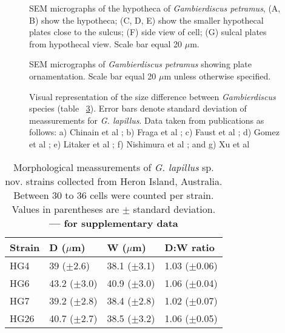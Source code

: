 \documentclass[12pt]{article}
\begin{document}
\FloatBarrier 
\begin{figure} 
\caption{SEM micrographs of the hypotheca of \emph{Gambierdiscus petramus}, (A, B) show the hypotheca; (C, D, E) show the smaller hypothecal plates close to the sulcus; (F) side view of cell; (G) sulcal plates from hypothecal view. Scale bar equal 20 $\mu$m.} 
\label{fig:hypoSEM}
\end{figure} 
\FloatBarrier

\FloatBarrier 
\begin{figure} 
\caption{SEM micrographs of \emph{Gambierdiscus petramus} showing plate ornamentation. Scale bar equal 20 $\mu$m unless otherwise specified.} 
\label{fig:ornSEM}
\end{figure} 
\FloatBarrier

\FloatBarrier 
\begin{figure} 
\caption{Visual representation of the size difference between \emph{Gambierdiscus} species (table ~\ref{fig:SizeGraph}). Error bars denote standard deviation of meassurements for \emph{G. lapillus}. Data taken from publications as follows: a) Chinain et al \citep{chinain1999morphology}; b) Fraga et al \citep{fraga2014genus}; c) Faust et al \citep{faust1995observation}; d) Gomez et al \citep{gomez2015fukuyoa}; e) Litaker et al \citep{litaker2009taxonomy}; f) Nishimura et al \citep{nishimura2014morphology}; and g) Xu et al \citep{xu2014distribution}} 
\label{fig:SizeGraph}
\end{figure} 




\FloatBarrier
\begin{table}
\caption{Morphological meassurements of \emph{G. lapillus }sp. nov. strains collected from Heron Island, Australia. Between 30 to 36 cells were counted per strain. Values in parentheses are $\pm$ standard deviation. \textbf{--- for supplementary data}}
\label{tbl:SizeTable}
\begin{tabular}{ | p{2cm} | p{2.5cm} | p{2.5cm} | p{2.5cm} | }
\hline
 \textbf{Strain} & \textbf{D ($\mu$m)} & \textbf{W ($\mu$m)}  & \textbf{D:W ratio}  \\
 \hline
 HG4  & 39 ($\pm$2.6) & 38.1 ($\pm$3.1) & 1.03 ($\pm$0.06) \\

 HG6  & 43.2 ($\pm$3.0) & 40.9 ($\pm$3.0) & 1.06 ($\pm$0.04)  \\

 HG7  & 39.2 ($\pm$2.8) & 38.4 ($\pm$2.8) & 1.02 ($\pm$0.07)  \\

 HG26  & 40.7 ($\pm$2.7) & 38.5 ($\pm$3.2) & 1.06 ($\pm$0.05) \\
 \hline
\end{tabular}
\end{table}
\FloatBarrier
\end{document}

